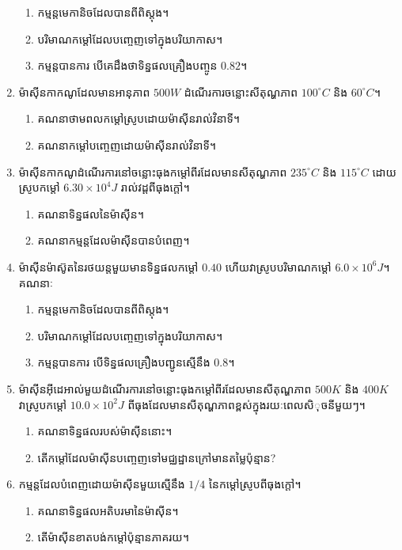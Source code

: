 \begin{enumerate}
\begin{enumerate}
		\item កម្មន្តមេកានិចដែលបានពីពិស្តុង។
		\item បរិមាណកម្តៅដែលបញ្ចេញទៅក្នុងបរិយាកាស។
		\item កម្មន្តបានការ បើគេដឹងថាទិន្នផលគ្រឿងបញ្ចូន $0.82$។
	\end{enumerate} 
	\item ម៉ាសុីនកាកណូដែលមានអានុភាព $500W$ ដំណើរការចន្លោះសីតុណ្ហភាព $100^\circ C$ និង $60^\circ C$។ 
	\begin{enumerate}
		\item គណនាថាមពលកម្តៅស្រូបដោយម៉ាសុីនរាល់វិនាទី។
		\item គណនាកម្តៅបញ្ចេញដោយម៉ាសុីនរាល់វិនាទី។
	\end{enumerate}
	\item ម៉ាសុីនកាកណូដំណើរការនៅចន្លោះធុងកម្តៅពីរដែលមានសីតុណ្ហភាព $235^\circ C$ និង $115^\circ C$ ដោយស្រូបកម្តៅ $6.30\times10^{4}J$ រាល់វដ្តពីធុងក្តៅ។
	\begin{enumerate}
		\item គណនាទិន្នផលនៃម៉ាសុីន។
		\item គណនាកម្មន្តដែលម៉ាសុីនបានបំពេញ។
	\end{enumerate}
	\item ម៉ាសុីនម៉ាស៊ូតនៃរថយន្តមួយមានទិន្នផលកម្តៅ $0.40$ ហើយវាស្រូបបរិមាណកម្តៅ $6.0\times10^{6}J$។ គណនាៈ
	\begin{enumerate}
		\item កម្មន្តមេកានិចដែលបានពីពិស្តុង។
		\item បរិមាណកម្តៅដែលបញ្ចេញទៅក្នុងបរិយាកាស។
		\item កម្មន្តបានការ បើទិន្នផលគ្រឿងបញ្ជូនស្មើនឹង $0.8$។
	\end{enumerate}
	\item ម៉ាសុីនអុីដេអាល់មួយដំណើរការនៅចន្លោះធុងកម្តៅពីរដែលមានសីតុណ្ហភាព $500K$ និង $400K$ វាស្រូបកម្តៅ $10.0\times10^{2}J$ ពីធុងដែលមានសីតុណ្ហភាពខ្ពស់ក្នុងរយៈពេលសិុចនីមួយៗ។
	\begin{enumerate}
		\item គណនាទិន្នផលរបស់ម៉ាសុីននោះ។
		\item តើកម្តៅដែលម៉ាសុីនបញ្ចេញទៅមជ្ឈដ្ឋានក្រៅមានតម្លៃប៉ុន្មាន?
	\end{enumerate}
	\item កម្មន្តដែលបំពេញដោយម៉ាសុីនមួយស្មើនឹង $1/4$ នៃកម្តៅស្រូបពីធុងក្តៅ។
	\begin{enumerate}
		\item គណនាទិន្នផលអតិបរមានៃម៉ាសុីន។
		\item តើម៉ាសុីនខាតបង់កម្តៅប៉ុន្មានភាគរយ។
	\end{enumerate}

\end{enumerate}

